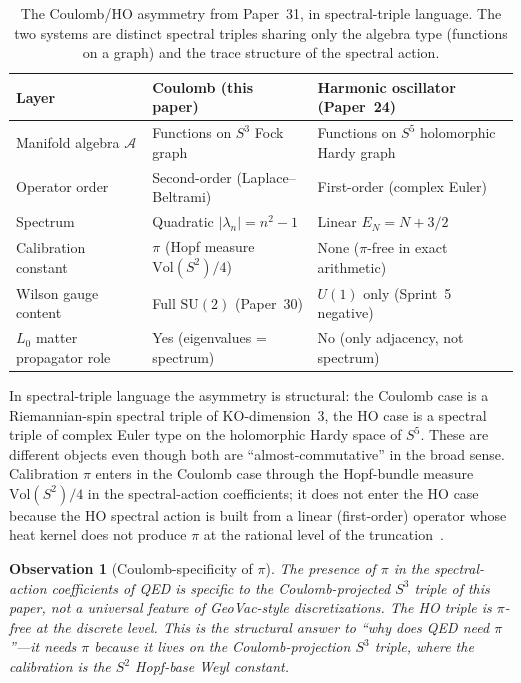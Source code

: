 \documentclass[11pt]{article}
\newtheorem{observation}{Observation}
\begin{document}
\begin{table}[h]
\centering
\small
\begin{tabular}{lll}
\toprule
Layer & Coulomb (this paper) & Harmonic oscillator (Paper~24) \\
\midrule
Manifold algebra $\mathcal{A}$ &
  Functions on $S^3$ Fock graph &
  Functions on $S^5$ holomorphic Hardy graph \\
Operator order &
  Second-order (Laplace--Beltrami) &
  First-order (complex Euler) \\
Spectrum &
  Quadratic $|\lambda_n| = n^2 - 1$ &
  Linear $E_N = N + 3/2$ \\
Calibration constant &
  $\pi$ (Hopf measure $\mathrm{Vol}(S^2)/4$) &
  None ($\pi$-free in exact arithmetic) \\
Wilson gauge content &
  Full $\mathrm{SU}(2)$ (Paper~30) &
  $U(1)$ only (Sprint~5 negative) \\
$L_0$ matter propagator role &
  Yes (eigenvalues = spectrum) &
  No (only adjacency, not spectrum) \\
\bottomrule
\end{tabular}
\caption{The Coulomb/HO asymmetry from Paper~31, in spectral-triple
language.  The two systems are distinct spectral triples sharing only
the algebra type (functions on a graph) and the trace structure of the
spectral action.}
\label{tab:coulomb_ho}
\end{table}

In spectral-triple language the asymmetry is structural: the Coulomb
case is a Riemannian-spin spectral triple of $\mathrm{KO}$-dimension~3,
the HO case is a spectral triple of complex Euler type on the
holomorphic Hardy space of $S^5$.  These are different objects even
though both are ``almost-commutative'' in the broad sense.  Calibration
$\pi$ enters in the Coulomb case through the Hopf-bundle measure
$\mathrm{Vol}(S^2) / 4$ in the spectral-action coefficients; it does
not enter the HO case because the HO spectral action is built from a
linear (first-order) operator whose heat kernel does not produce $\pi$
at the rational level of the truncation~\cite{paper24}.

\begin{observation}[Coulomb-specificity of $\pi$]
\label{obs:pi_coulomb}
The presence of $\pi$ in the spectral-action coefficients of QED is
specific to the Coulomb-projected $S^3$ triple of this paper, not a
universal feature of GeoVac-style discretizations.  The HO triple is
$\pi$-free at the discrete level.  This is the structural answer to
``why does QED need $\pi$''---it needs $\pi$ because it lives on the
Coulomb-projection $S^3$ triple, where the calibration is the
$S^2$ Hopf-base Weyl constant.
\end{observation}
\end{document}
